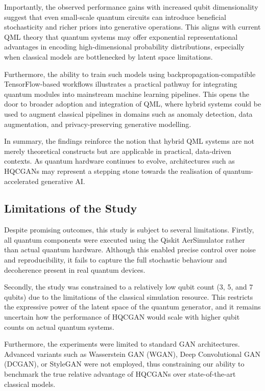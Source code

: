 \documentclass[conference]{IEEEtran}
\begin{document}
Importantly, the observed performance gains with increased qubit dimensionality suggest that even small-scale quantum circuits can introduce beneficial stochasticity and richer priors into generative operations. This aligns with current QML theory that quantum systems may offer exponential representational advantages in encoding high-dimensional probability distributions, especially when classical models are bottlenecked by latent space limitations.

Furthermore, the ability to train such models using backpropagation-compatible TensorFlow-based workflows illustrates a practical pathway for integrating quantum modules into mainstream machine learning pipelines. This opens the door to broader adoption and integration of QML, where hybrid systems could be used to augment classical pipelines in domains such as anomaly detection, data augmentation, and privacy-preserving generative modelling.

In summary, the findings reinforce the notion that hybrid QML systems are not merely theoretical constructs but are applicable in practical, data-driven contexts. As quantum hardware continues to evolve, architectures such as HQCGANs may represent a stepping stone towards the realisation of quantum-accelerated generative AI.

\subsection{Limitations of the Study}\label{limitations}

Despite promising outcomes, this study is subject to several limitations. Firstly, all quantum components were executed using the Qiskit AerSimulator rather than actual quantum hardware. Although this enabled precise control over noise and reproducibility, it fails to capture the full stochastic behaviour and decoherence present in real quantum devices.

Secondly, the study was constrained to a relatively low qubit count (3, 5, and 7 qubits) due to the limitations of the classical simulation resource. This restricts the expressive power of the latent space of the quantum generator, and it remains uncertain how the performance of HQCGAN would scale with higher qubit counts on actual quantum systems.

Furthermore, the experiments were limited to standard GAN architectures. Advanced variants such as Wasserstein GAN (WGAN), Deep Convolutional GAN (DCGAN), or StyleGAN were not employed, thus constraining our ability to benchmark the true relative advantage of HQCGANs over state-of-the-art classical models.
\end{document}
